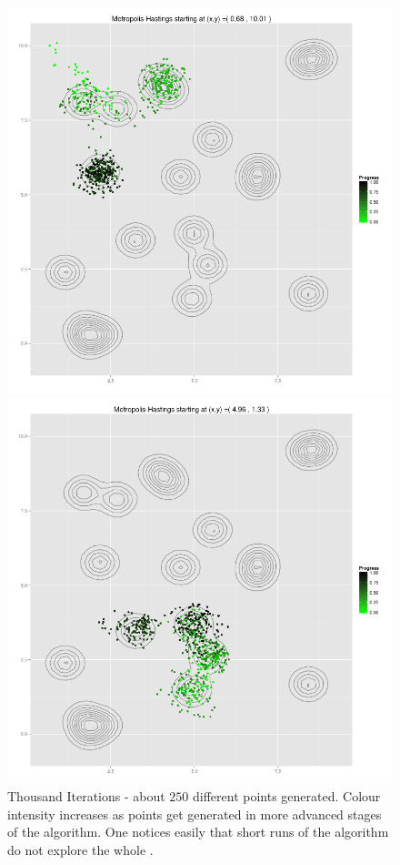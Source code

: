 \begin{figure}
	\begin{minipage}[b]{.5\linewidth}
		\centering \includegraphics[scale=.25]{./img/MH_simululation_1000_steps_ex1.png}
	\end{minipage}%
	\begin{minipage}[b]{.5\linewidth}
		\centering \includegraphics[scale=.25]{./img/MH_simululation_1000_steps_ex2.png}
	\end{minipage}
	\caption{Thousand Iterations - about $250$ different points generated. Colour intensity increases as points get generated in more advanced stages of the algorithm. One notices easily that short runs of the algorithm do not explore the whole \sspace.}\label{unexploredShort}
\end{figure}


